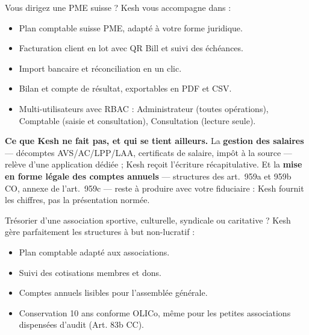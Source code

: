 \documentclass[a4paper,11pt,oneside]{article}
\begin{document}
\vspace{0.5cm}

\begin{tcolorbox}[%
    enhanced, breakable,
    colback=white, colframe=keshBorder,
    boxrule=0.5pt, arc=4pt%
]
\sffamily

\textbf{\large\color{keshPrimary}{\faBuilding\ PME suisse (Sàrl, SA, coopérative)}}

\vspace{0.3cm}

Vous dirigez une PME suisse ? Kesh vous accompagne dans :

\begin{itemize}
    \item Plan comptable suisse PME, adapté à votre forme juridique.
    \item Facturation client en lot avec QR Bill et suivi des échéances.
    \item Import bancaire et réconciliation en un clic.
    \item Bilan et compte de résultat, exportables en PDF et CSV.
    \item Multi-utilisateurs avec RBAC : Administrateur (toutes opérations), Comptable (saisie et consultation), Consultation (lecture seule).
\end{itemize}

\medskip
\noindent\textbf{Ce que Kesh ne fait pas, et qui se tient ailleurs.} La \textbf{gestion des
salaires} --- décomptes AVS/AC/LPP/LAA, certificats de salaire, impôt à la source --- relève
d'une application dédiée ; Kesh reçoit l'écriture récapitulative. Et la \textbf{mise en forme
légale des comptes annuels} --- structures des art.~959a et 959b CO, annexe de l'art.~959c ---
reste à produire avec votre fiduciaire : Kesh fournit les chiffres, pas la présentation
normée.

\end{tcolorbox}

\vspace{0.5cm}

\begin{tcolorbox}[%
    enhanced, breakable,
    colback=white, colframe=keshBorder,
    boxrule=0.5pt, arc=4pt%
]
\sffamily

\textbf{\large\color{keshPrimary}{\faHandshake\ Association ou fondation}}

\vspace{0.3cm}

Trésorier d'une association sportive, culturelle, syndicale ou caritative ? Kesh gère parfaitement les structures à but non-lucratif :

\begin{itemize}
    \item Plan comptable adapté aux associations.
    \item Suivi des cotisations membres et dons.
    \item Comptes annuels lisibles pour l'assemblée générale.
    \item Conservation 10 ans conforme OLICo, même pour les petites associations dispensées d'audit (Art. 83b CC).
\end{itemize}

\end{tcolorbox}
\end{document}

